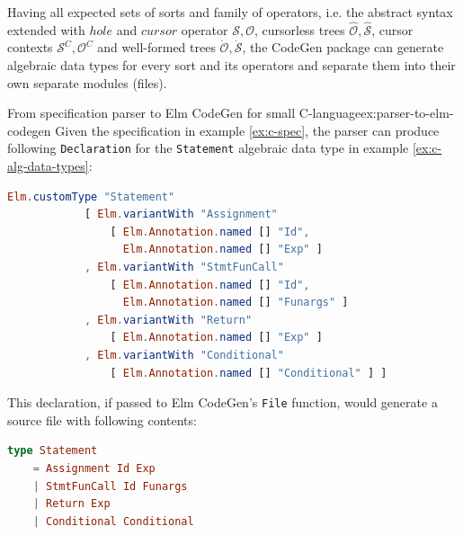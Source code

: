 Having all expected sets of sorts and family of operators,
i.e. the abstract syntax extended with $hole$ and $cursor$ operator $\mathcal{S},
  \mathcal{O}$, cursorless trees $\hat{\mathcal{O}},\hat{\mathcal{S}}$,
cursor contexts $\mathcal{S}^C,\mathcal{O}^C$ and
well-formed trees $\dot{\mathcal{O}},\dot{\mathcal{S}}$,
the CodeGen package can generate algebraic data types for every sort and its operators
and separate them into their own separate modules (files).

\begin{example}{From specification parser to Elm CodeGen for small C-language}{ex:parser-to-elm-codegen}
  Given the specification in example \cref{ex:c-spec}, the parser can produce following \texttt{Declaration} for the \texttt{Statement} algebraic data type in example \cref{ex:c-alg-data-types}:
  \begin{lstlisting}[backgroundcolor=\color{myexamplecolorback},language=elm]
Elm.customType "Statement"
            [ Elm.variantWith "Assignment" 
                [ Elm.Annotation.named [] "Id", 
                  Elm.Annotation.named [] "Exp" ]
            , Elm.variantWith "StmtFunCall" 
                [ Elm.Annotation.named [] "Id", 
                  Elm.Annotation.named [] "Funargs" ]
            , Elm.variantWith "Return" 
                [ Elm.Annotation.named [] "Exp" ]
            , Elm.variantWith "Conditional" 
                [ Elm.Annotation.named [] "Conditional" ] ]
\end{lstlisting}

  This declaration, if passed to Elm CodeGen's \texttt{File} function, would generate a source file with following contents:
  \begin{lstlisting}[backgroundcolor=\color{myexamplecolorback},language=elm]
type Statement
    = Assignment Id Exp
    | StmtFunCall Id Funargs
    | Return Exp
    | Conditional Conditional
\end{lstlisting}
\end{example}

